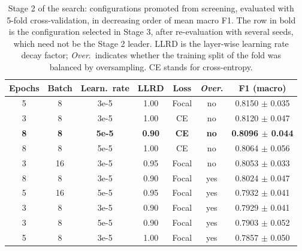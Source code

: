 \begin{table}[!t]
\centering
\caption{Stage 2 of the search: configurations promoted from screening, evaluated with 5-fold cross-validation, in decreasing order of mean macro F1. The row in bold is the configuration selected in Stage 3, after re-evaluation with several seeds, which need not be the Stage 2 leader. LLRD is the layer-wise learning rate decay factor; \emph{Over}.\ indicates whether the training split of the fold was balanced by oversampling. CE stands for cross-entropy.}
\label{tab:halving}
\begin{tabular}{ccccccc}
\toprule
Epochs & Batch & Learn.\ rate & LLRD & Loss & \emph{Over}. & F1 (macro) \\
\midrule
5 & 8 & 3e-5 & 1.00 & Focal & no & 0.8150 $\pm$ 0.035 \\
3 & 8 & 3e-5 & 1.00 & CE & no & 0.8120 $\pm$ 0.047 \\
\textbf{8} & \textbf{8} & \textbf{5e-5} & \textbf{0.90} & \textbf{CE} & \textbf{no} & \textbf{0.8096 $\pm$ 0.044} \\
8 & 8 & 5e-5 & 1.00 & CE & no & 0.8064 $\pm$ 0.056 \\
3 & 16 & 3e-5 & 0.95 & Focal & no & 0.8053 $\pm$ 0.033 \\
8 & 8 & 3e-5 & 0.90 & Focal & yes & 0.8024 $\pm$ 0.047 \\
5 & 16 & 5e-5 & 0.95 & Focal & yes & 0.7932 $\pm$ 0.041 \\
3 & 8 & 3e-5 & 0.90 & Focal & yes & 0.7929 $\pm$ 0.041 \\
3 & 8 & 5e-5 & 0.90 & Focal & yes & 0.7903 $\pm$ 0.052 \\
5 & 8 & 3e-5 & 1.00 & Focal & yes & 0.7857 $\pm$ 0.050 \\
\bottomrule
\end{tabular}
\end{table}
